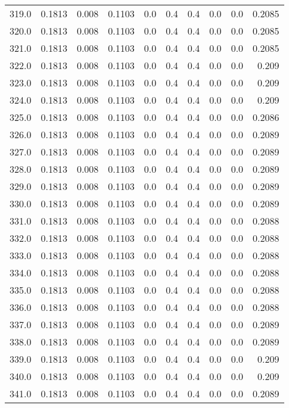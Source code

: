 \begin{longtable}{lrrrrrrrrr}
319.0 & 0.1813 & 0.008 & 0.1103 & 0.0 & 0.4 & 0.4 & 0.0 & 0.0 & 0.2085 \\
320.0 & 0.1813 & 0.008 & 0.1103 & 0.0 & 0.4 & 0.4 & 0.0 & 0.0 & 0.2085 \\
321.0 & 0.1813 & 0.008 & 0.1103 & 0.0 & 0.4 & 0.4 & 0.0 & 0.0 & 0.2085 \\
322.0 & 0.1813 & 0.008 & 0.1103 & 0.0 & 0.4 & 0.4 & 0.0 & 0.0 & 0.209 \\
323.0 & 0.1813 & 0.008 & 0.1103 & 0.0 & 0.4 & 0.4 & 0.0 & 0.0 & 0.209 \\
324.0 & 0.1813 & 0.008 & 0.1103 & 0.0 & 0.4 & 0.4 & 0.0 & 0.0 & 0.209 \\
325.0 & 0.1813 & 0.008 & 0.1103 & 0.0 & 0.4 & 0.4 & 0.0 & 0.0 & 0.2086 \\
326.0 & 0.1813 & 0.008 & 0.1103 & 0.0 & 0.4 & 0.4 & 0.0 & 0.0 & 0.2089 \\
327.0 & 0.1813 & 0.008 & 0.1103 & 0.0 & 0.4 & 0.4 & 0.0 & 0.0 & 0.2089 \\
328.0 & 0.1813 & 0.008 & 0.1103 & 0.0 & 0.4 & 0.4 & 0.0 & 0.0 & 0.2089 \\
329.0 & 0.1813 & 0.008 & 0.1103 & 0.0 & 0.4 & 0.4 & 0.0 & 0.0 & 0.2089 \\
330.0 & 0.1813 & 0.008 & 0.1103 & 0.0 & 0.4 & 0.4 & 0.0 & 0.0 & 0.2089 \\
331.0 & 0.1813 & 0.008 & 0.1103 & 0.0 & 0.4 & 0.4 & 0.0 & 0.0 & 0.2088 \\
332.0 & 0.1813 & 0.008 & 0.1103 & 0.0 & 0.4 & 0.4 & 0.0 & 0.0 & 0.2088 \\
333.0 & 0.1813 & 0.008 & 0.1103 & 0.0 & 0.4 & 0.4 & 0.0 & 0.0 & 0.2088 \\
334.0 & 0.1813 & 0.008 & 0.1103 & 0.0 & 0.4 & 0.4 & 0.0 & 0.0 & 0.2088 \\
335.0 & 0.1813 & 0.008 & 0.1103 & 0.0 & 0.4 & 0.4 & 0.0 & 0.0 & 0.2088 \\
336.0 & 0.1813 & 0.008 & 0.1103 & 0.0 & 0.4 & 0.4 & 0.0 & 0.0 & 0.2088 \\
337.0 & 0.1813 & 0.008 & 0.1103 & 0.0 & 0.4 & 0.4 & 0.0 & 0.0 & 0.2089 \\
338.0 & 0.1813 & 0.008 & 0.1103 & 0.0 & 0.4 & 0.4 & 0.0 & 0.0 & 0.2089 \\
339.0 & 0.1813 & 0.008 & 0.1103 & 0.0 & 0.4 & 0.4 & 0.0 & 0.0 & 0.209 \\
340.0 & 0.1813 & 0.008 & 0.1103 & 0.0 & 0.4 & 0.4 & 0.0 & 0.0 & 0.209 \\
341.0 & 0.1813 & 0.008 & 0.1103 & 0.0 & 0.4 & 0.4 & 0.0 & 0.0 & 0.2089 \\

\end{longtable}

